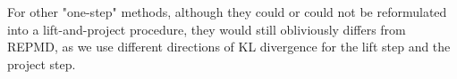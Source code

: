 For other "one-step" methods, although they could or could not be reformulated into a lift-and-project procedure,
they would still obliviously differs from REPMD, as we use different directions of KL divergence for the lift step and the project step. 




